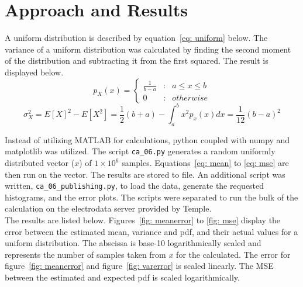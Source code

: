 \section{Approach and Results} 
A uniform distribution is described by equation~\ref{eq: uniform} below. The variance of a uniform distribution was calculated by finding the second moment of the distribution and subtracting it from the first squared. The result is displayed below.  
\begin{equation}
p_X(x) = \left\{ 
	\begin{array}{lcr}
		\frac{1}{b-a} & : & a \leq x \leq b \\
		0 & : & otherwise
	\end{array} 
	\right.
\label{eq: uniform}
\end{equation}
\begin{equation}
\sigma^2_X= E[X]^2 - E[X^2] = \frac{1}{2}(b + a) - \int_{a}^b x^2p_x(x)dx = \frac{1}{12}(b - a)^2
\end{equation}

Instead of utilizing MATLAB for calculations, python coupled with numpy and matplotlib was utilized. The script \verb|ca_06.py| generates a random uniformly distributed vector ($x$) of $1\times10^6$ samples. Equations~\ref{eq: mean} to \ref{eq: mse} are then run on the vector. The results are stored to file. An additional script was written, \verb|ca_06_publishing.py|, to load the data, generate the requested histograms, and the error plots. The scripts were separated to run the bulk of the calculation on the electrodata server provided by Temple. \\

The results are listed below. Figures~\ref{fig: meanerror} to \ref{fig: mse} display the error between the estimated mean, variance and pdf, and their actual  values for a uniform distribution. The abscissa is base-10 logarithmically scaled and represents the number of samples taken from $x$ for the calculated. The error for figure~\ref{fig: meanerror} and figure~\ref{fig: varerror} is scaled linearly. The MSE between the estimated and expected pdf is scaled logarithmically. \\


